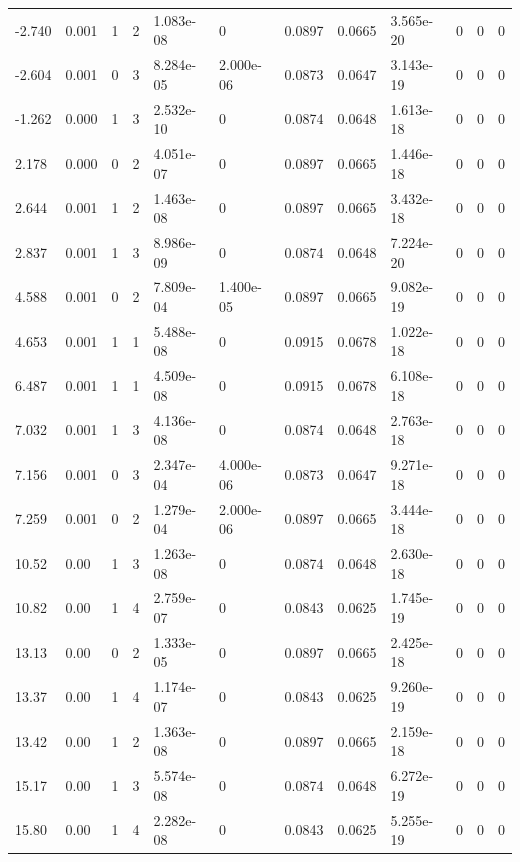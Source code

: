 \documentclass[preview]{standalone}
\begin{document}
{{\begin{tabular}{L{1.2cm}C{1.2cm} C{0.3cm}C{0.5cm} C{1.4cm}C{1.4cm} C{1.4cm}C{1.4cm} C{1.6cm}C{1.6cm} C{1.6cm}C{1.6cm}}
  -2.740  &  0.001  & 1     &  2 &  1.083e-08  & 0  &  0.0897&   0.0665& 3.565e-20 & 0   &  0 & 0  \\ 
  -2.604  &  0.001  & 0     &  3 &  8.284e-05  & 2.000e-06  &  0.0873&   0.0647& 3.143e-19 & 0   &  0 & 0  \\ 
  -1.262  &  0.000  & 1     &  3 &  2.532e-10  & 0  &  0.0874&   0.0648& 1.613e-18 & 0   &  0 & 0  \\ 
  2.178  &  0.000  & 0     &  2 &  4.051e-07  & 0  &  0.0897&   0.0665& 1.446e-18 & 0   &  0 & 0  \\ 
  2.644  &  0.001  & 1     &  2 &  1.463e-08  & 0  &  0.0897&   0.0665& 3.432e-18 & 0   &  0 & 0  \\ 
  2.837  &  0.001  & 1     &  3 &  8.986e-09  & 0  &  0.0874&   0.0648& 7.224e-20 & 0   &  0 & 0  \\ 
  4.588  &  0.001  & 0     &  2 &  7.809e-04  & 1.400e-05  &  0.0897&   0.0665& 9.082e-19 & 0   &  0 & 0  \\ 
  4.653  &  0.001  & 1     &  1 &  5.488e-08  & 0  &  0.0915&   0.0678& 1.022e-18 & 0   &  0 & 0  \\ 
  6.487  &  0.001  & 1     &  1 &  4.509e-08  & 0  &  0.0915&   0.0678& 6.108e-18 & 0   &  0 & 0  \\ 
  7.032  &  0.001  & 1     &  3 &  4.136e-08  & 0  &  0.0874&   0.0648& 2.763e-18 & 0   &  0 & 0  \\ 
  7.156  &  0.001  & 0     &  3 &  2.347e-04  & 4.000e-06  &  0.0873&   0.0647& 9.271e-18 & 0   &  0 & 0  \\ 
  7.259  &  0.001  & 0     &  2 &  1.279e-04  & 2.000e-06  &  0.0897&   0.0665& 3.444e-18 & 0   &  0 & 0  \\ 
  10.52  &  0.00  & 1     &  3 &  1.263e-08  & 0  &  0.0874&   0.0648& 2.630e-18 & 0   &  0 & 0  \\ 
  10.82  &  0.00  & 1     &  4 &  2.759e-07  & 0  &  0.0843&   0.0625& 1.745e-19 & 0   &  0 & 0  \\ 
  13.13  &  0.00  & 0     &  2 &  1.333e-05  & 0  &  0.0897&   0.0665& 2.425e-18 & 0   &  0 & 0  \\ 
  13.37  &  0.00  & 1     &  4 &  1.174e-07  & 0  &  0.0843&   0.0625& 9.260e-19 & 0   &  0 & 0  \\ 
  13.42  &  0.00  & 1     &  2 &  1.363e-08  & 0  &  0.0897&   0.0665& 2.159e-18 & 0   &  0 & 0  \\ 
  15.17  &  0.00  & 1     &  3 &  5.574e-08  & 0  &  0.0874&   0.0648& 6.272e-19 & 0   &  0 & 0  \\ 
  15.80  &  0.00  & 1     &  4 &  2.282e-08  & 0  &  0.0843&   0.0625& 5.255e-19 & 0   &  0 & 0  \\ 

\end{tabular}}}
\end{document}
